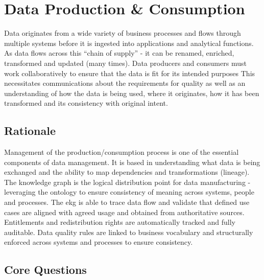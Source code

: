\section{Data Production \& Consumption}\label{sec:ekgmm-b-4-3} %

Data originates from a wide variety of business processes and flows through multiple systems before it is ingested into applications and analytical functions.
As data flows across this “chain of supply” - it can be renamed, enriched, transformed and updated (many times).
Data producers and consumers must work collaboratively to ensure that the data is fit for its intended purposes
This necessitates communications about the requirements for quality as well as an understanding of how the data is being used,
where it originates, how it has been transformed and its consistency with original intent.

\subsection*{ Rationale}

Management of the production/consumption process is one of the essential components of data management.
It is based in understanding what data is being exchanged and the ability to map dependencies and transformations (lineage).
The knowledge graph is the logical distribution point for data manufacturing - leveraging the ontology to ensure consistency of meaning across systems, people and processes.
The \acrshort{ekg} is able to trace data flow and validate that defined use cases are aligned with agreed usage and obtained from authoritative sources.
Entitlements and redistribution rights are automatically tracked and fully auditable.
Data quality rules are linked to business vocabulary and structurally enforced across systems and processes to ensure consistency.

\subsection*{Core Questions}

